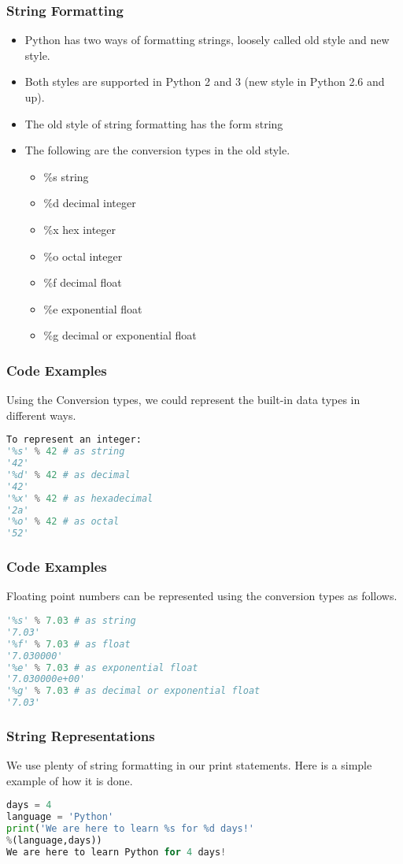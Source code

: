 \documentclass{beamer}
\begin{document}
\begin{frame}
\frametitle{String Formatting}
\begin{itemize}
\item Python has two ways of formatting strings, loosely called old style and new style. 
\item Both styles are supported in Python 2 and 3 (new style in Python 2.6 and up).
\item The old style of string formatting has the form string %
\item The following are the conversion types  in the old style.
\begin{itemize}
\item \%s string
\item \%d decimal integer
\item \%x hex integer
\item \%o octal integer
\item \%f decimal float
\item \%e exponential float
\item \%g decimal or exponential float
\end{itemize}
\end{itemize}

\end{frame}


\begin{frame}[fragile]
\frametitle{Code Examples}
Using the Conversion types, we could represent the built-in data types in different ways.
\begin{lstlisting}[language=Python]
To represent an integer:
'%s' % 42 # as string
'42'
'%d' % 42 # as decimal
'42'
'%x' % 42 # as hexadecimal
'2a'
'%o' % 42 # as octal
'52'
\end{lstlisting}
\end{frame}

\begin{frame}[fragile]
\frametitle{Code Examples}
Floating point numbers can be represented using the conversion types as follows.
\begin{lstlisting}[language=Python]
'%s' % 7.03 # as string
'7.03'
'%f' % 7.03 # as float
'7.030000'	
'%e' % 7.03 # as exponential float
'7.030000e+00'
'%g' % 7.03 # as decimal or exponential float
'7.03'
\end{lstlisting}
\end{frame}

\begin{frame}[fragile]
\frametitle{String Representations}
We use plenty of string formatting in our print statements. Here is a simple example of how it is done.
\begin{lstlisting}[language=Python]
days = 4
language = 'Python'
print('We are here to learn %s for %d days!'
%(language,days))
We are here to learn Python for 4 days!
\end{lstlisting}

\end{frame}
\end{document}
